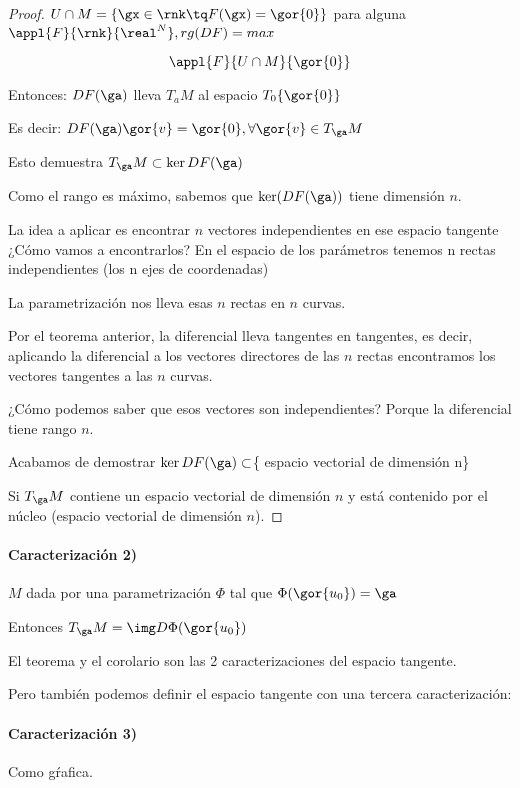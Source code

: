 \begin{proof}
$U\cap M =\{ \gx \in \rnk \tq F(\gx) = \gor{0}\}$ para alguna $\appl{F}{\rnk}{\real^N}, rg(DF) = max$

\[\appl{F}{U\cap M}{\gor{0}}\]

Entonces: $DF(\ga)$ lleva $T_a M$ al espacio $T_0\{\gor{0}\}$

Es decir: $DF(\ga)\gor{v} = \gor{0}, \forall \gor{v}\in T_{\ga} M$

Esto demuestra $T_{\ga} M \subset \ker DF(\ga)$

Como el rango es máximo, sabemos que $\ker(DF(\ga))$ tiene dimensión $n$.

La idea a aplicar es encontrar $n$ vectores independientes en ese espacio tangente ¿Cómo vamos a encontrarlos? En el espacio de los parámetros tenemos n rectas independientes (los n ejes de coordenadas)

La parametrización nos lleva esas $n$ rectas en $n$ curvas. 

Por el teorema anterior, la diferencial lleva tangentes en tangentes, es decir, aplicando la diferencial a los vectores directores de las $n$ rectas encontramos los vectores tangentes a las $n$ curvas. 

¿Cómo podemos saber que esos vectores son independientes? Porque la diferencial tiene rango $n$.

Acabamos de demostrar  $\ker DF(\ga) \subset $\{ espacio vectorial de dimensión n\} 

Si $T_{\ga} M$ contiene un espacio vectorial de dimensión $n$ y está contenido por el núcleo (espacio vectorial de dimensión $n$).
\end{proof}

\paragraph{Caracterización 2)}
\begin{corol}
\label{CaractSubv_2}
$M$ dada por una parametrización $\Phi$ tal que $\Phi(\gor{u_0}) = \ga$ 

Entonces $T_{\ga} M = \img D\Phi(\gor{u_0})$

\end{corol}


El teorema y el corolario son las 2 caracterizaciones del espacio tangente.

Pero también podemos definir el espacio tangente con una tercera caracterización:

\paragraph{Caracterización 3)} Como gŕafica.

